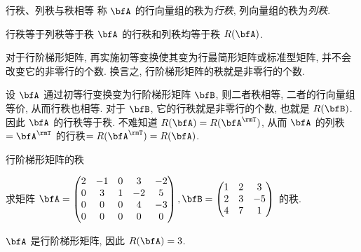 \begin{frame}{行秩、列秩与秩相等}
	\onslide<+->
	称 $\bfA$ 的行向量组的秩为\emph{行秩}, 列向量组的秩为\emph{列秩}.
	\onslide<+->
	\begin{second}{行秩等于列秩等于秩}
		$\bfA$ 的行秩和列秩均等于秩 $R(\bfA)$.
	\end{second}
	\onslide<+->
	对于行阶梯形矩阵, 再实施初等变换使其变为行最简形矩阵或标准型矩阵, 并不会改变它的非零行的个数.
	\onslide<+->
	换言之, \alert{行阶梯形矩阵的秩就是非零行的个数}.

	\onslide<+->
	设 $\bfA$ 通过初等行变换变为行阶梯形矩阵 $\bfB$, 则二者秩相等, 二者的行向量组等价, 从而行秩也相等.
	\onslide<+->
	对于 $\bfB$, 它的行秩就是非零行的个数, 也就是 $R(\bfB)$.
	\onslide<+->
	因此 $\bfA$ 的行秩等于秩.
	\onslide<+->
	不难知道 $R(\bfA)=R(\bfA^\rmT)$,
	从而 $\bfA$ 的列秩$=\bfA^\rmT$ 的行秩$=R(\bfA^\rmT)=R(\bfA)$.
\end{frame}


\begin{frame}{行阶梯形矩阵的秩}
	\onslide<+->
	\begin{example}
		求矩阵 $\bfA=\begin{pmatrix}
			2&-1&0&3&-2\\
			0&3&1&-2&5\\
			0&0&0&4&-3\\
			0&0&0&0&0
		\end{pmatrix},\bfB=\begin{pmatrix}
			1&2&3\\
			2&3&-5\\
			4&7&1
		\end{pmatrix}$ 的秩.
	\end{example}
	\onslide<+->
	\begin{solution}
		$\bfA$ 是行阶梯形矩阵, 因此 $R(\bfA)=3$.
		\onslide<+->{\[\bfB\wsim{r_2-2r_1}{r_4-4r_1}\begin{pmatrix}
			1&2&3\\
			0&-1&-11\\
			0&-1&-11
		\end{pmatrix}\wsim{r_3-r_2}{-r_2}\begin{pmatrix}
			1&2&3\\
			0&1&11\\
			0&0&0
		\end{pmatrix}\visible<+->{\implies R(\bfB)=2.}\]}
		\vspace{-\baselineskip}
	\end{solution}
\end{frame}


